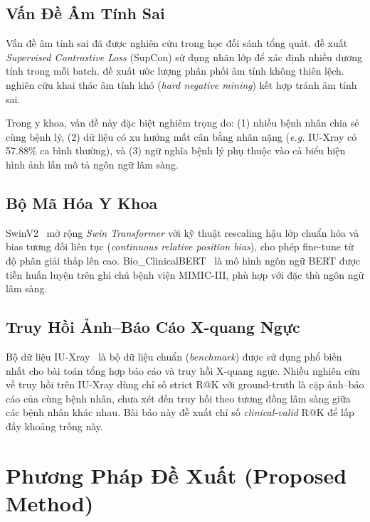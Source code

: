 \documentclass[12pt, a4paper]{article}
\newcommand{\eg}{\textit{e.g.}}
\begin{document}
\subsection{Vấn Đề Âm Tính Sai}

Vấn đề âm tính sai đã được nghiên cứu trong học đối sánh tổng quát.
\citet{khosla2020supervised} đề xuất \textit{Supervised Contrastive Loss}
(SupCon) sử dụng nhãn lớp để xác định nhiều dương tính trong mỗi batch.
\citet{chuang2020debiased} đề xuất ước lượng phân phối âm tính không thiên lệch.
\citet{robinson2021contrastive} nghiên cứu khai thác âm tính khó (\textit{hard
negative mining}) kết hợp tránh âm tính sai.

Trong y khoa, vấn đề này đặc biệt nghiêm trọng do: (1) nhiều bệnh nhân chia sẻ
cùng bệnh lý, (2) dữ liệu có xu hướng mất cân bằng nhãn nặng (\eg{} IU-Xray
có 57.88\% ca bình thường), và (3) ngữ nghĩa bệnh lý phụ thuộc vào cả biểu hiện
hình ảnh lẫn mô tả ngôn ngữ lâm sàng.

\subsection{Bộ Mã Hóa Y Khoa}

SwinV2~\citep{liu2022swin} mở rộng \textit{Swin Transformer} với kỹ thuật
rescaling hậu lớp chuẩn hóa và bias tương đối liên tục (\textit{continuous
relative position bias}), cho phép fine-tune từ độ phân giải thấp lên cao.
Bio\_ClinicalBERT~\citep{alsentzer2019publicly} là mô hình ngôn ngữ BERT
được tiền huấn luyện trên ghi chú bệnh viện MIMIC-III, phù hợp với đặc thù
ngôn ngữ lâm sàng.

\subsection{Truy Hồi Ảnh--Báo Cáo X-quang Ngực}

Bộ dữ liệu IU-Xray~\citep{demner2016preparing} là bộ dữ liệu chuẩn
(\textit{benchmark}) được sử dụng phổ biến nhất cho bài toán tổng hợp báo cáo
và truy hồi X-quang ngực. Nhiều nghiên cứu về truy hồi trên IU-Xray dùng chỉ
số strict R@K với ground-truth là cặp ảnh--báo cáo của cùng bệnh nhân, chưa
xét đến truy hồi theo tương đồng lâm sàng giữa các bệnh nhân khác nhau.
Bài báo này đề xuất chỉ số \textit{clinical-valid} R@K để lấp đầy khoảng
trống này.

\section{Phương Pháp Đề Xuất (Proposed Method)}
\label{sec:method}
\end{document}
